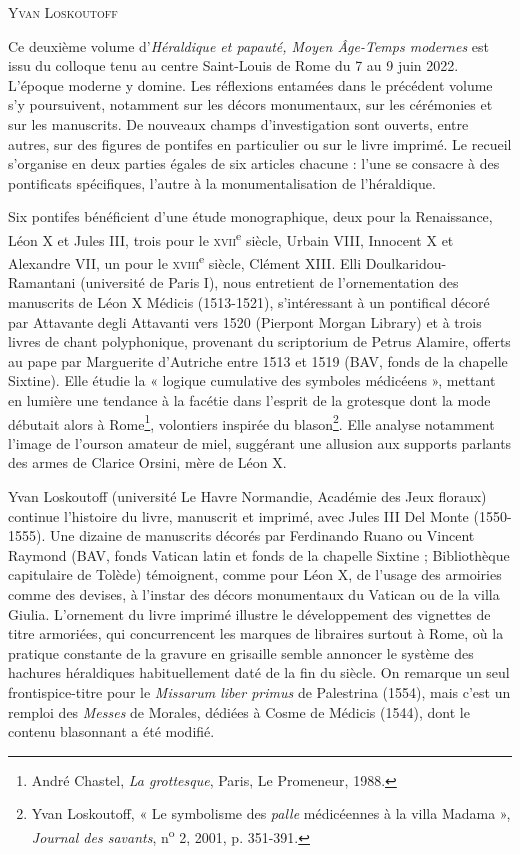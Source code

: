 \documentclass[12pt,twoside,openany]{book}
\newcommand{\PurhContributors}[1]{%
  \par\vspace{0.5\baselineskip}%
  {\normalsize\scshape #1\par}%
  \vspace{0.6\baselineskip}%
}
\begin{document}
\PurhContributors{Yvan Loskoutoff}

Ce deuxième volume d’\textit{Héraldique et papauté, Moyen Âge-Temps modernes} est issu du colloque tenu au centre Saint-Louis de Rome du 7 au 9 juin 2022. L’époque moderne y domine. Les réflexions entamées dans le précédent volume s’y poursuivent, notamment sur les décors monumentaux, sur les cérémonies et sur les manuscrits. De nouveaux champs d’investigation sont ouverts, entre autres, sur des figures de pontifes en particulier ou sur le livre imprimé. Le recueil s’organise en deux parties égales de six articles chacune : l’une se consacre à des pontificats spécifiques, l’autre à la monumentalisation de l’héraldique.

Six pontifes bénéficient d’une étude monographique, deux pour la Renaissance, Léon X et Jules III, trois pour le \textsc{xvii}\textsuperscript{e} siècle, Urbain VIII, Innocent X et Alexandre VII, un pour le \textsc{xviii}\textsuperscript{e} siècle, Clément XIII. Elli Doulkaridou-Ramantani (université de Paris I), nous entretient de l’ornementation des manuscrits de Léon X Médicis (1513-1521), s’intéressant à un pontifical décoré par Attavante degli Attavanti vers 1520 (Pierpont Morgan Library) et à trois livres de chant polyphonique, provenant du scriptorium de Petrus Alamire, offerts au pape par Marguerite d’Autriche entre 1513 et 1519 (BAV, fonds de la chapelle Sixtine). Elle étudie la « logique cumulative des symboles médicéens », mettant en lumière une tendance à la facétie dans l’esprit de la grotesque dont la mode débutait alors à Rome\footnote{André Chastel, \textit{La grottesque}, Paris, Le Promeneur, 1988.}, volontiers inspirée du blason\footnote{Yvan Loskoutoff, « Le symbolisme des \textit{palle} médicéennes à la villa Madama », \textit{Journal des savants}, n\textsuperscript{o} 2, 2001, p. 351-391.}. Elle analyse notamment l’image de l’ourson amateur de miel, suggérant une allusion aux supports parlants des armes de Clarice Orsini, mère de Léon X.

Yvan Loskoutoff (université Le Havre Normandie, Académie des Jeux floraux) continue l’histoire du livre, manuscrit et imprimé, avec Jules III Del Monte (1550-1555). Une dizaine de manuscrits décorés par Ferdinando Ruano ou Vincent Raymond (BAV, fonds Vatican latin et fonds de la chapelle Sixtine ; Bibliothèque capitulaire de Tolède) témoignent, comme pour Léon X, de l’usage des armoiries comme des devises, à l’instar des décors monumentaux du Vatican ou de la villa Giulia. L’ornement du livre imprimé illustre le développement des vignettes de titre armoriées, qui concurrencent les marques de libraires surtout à Rome, où la pratique constante de la gravure en grisaille semble annoncer le système des hachures héraldiques habituellement daté de la fin du siècle. On remarque un seul frontispice-titre pour le \textit{Missarum liber primus} de Palestrina (1554), mais c’est un remploi des \textit{Messes} de Morales, dédiées à Cosme de Médicis (1544), dont le contenu blasonnant a été modifié.
\end{document}
